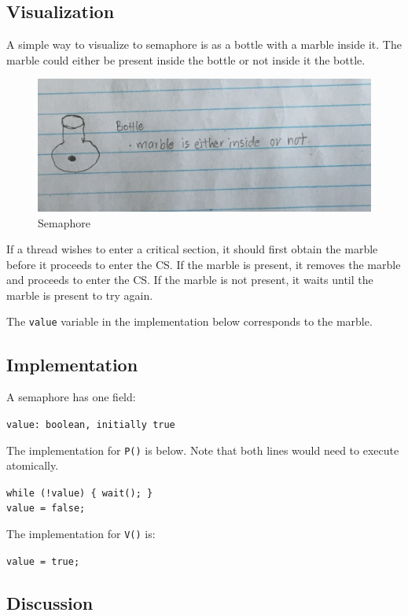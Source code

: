 \documentclass[twoside]{article}
\begin{document}
\subsection{Visualization}

A simple way to visualize to semaphore is as a bottle with a marble inside it. The marble could either be present inside the bottle or not inside it the bottle.

\begin{figure}
  \includegraphics[width=\linewidth]{img/bottle.png}
  \caption{Semaphore}
\end{figure}

If a thread wishes to enter a critical section, it should first obtain the marble before it proceeds to enter the CS.
If the marble is present, it removes the marble and proceeds to enter the CS.
If the marble is not present, it waits until the marble is present to try again.

The {\tt value} variable in the implementation below corresponds to the marble.

\subsection{Implementation}

A semaphore has one field:

{\tt value: boolean, initially true }

The implementation for {\tt P()} is below. Note that both lines would need to execute atomically.

{\tt while (!value) \{ wait(); \}\\
value = false;}

The implementation for {\tt V()} is:

{\tt value = true; }

\subsection{Discussion}
\end{document}

